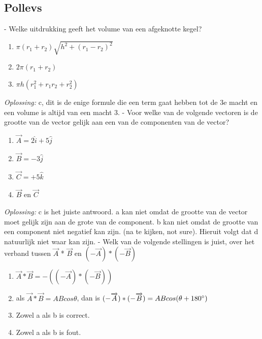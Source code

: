 \documentclass[12pt,a4paper]{article}
\begin{document}
    \subsection{Pollevs}
    - Welke uitdrukking geeft het volume van een afgeknotte kegel?
    \begin{enumerate}
        [label=\alph*)]
        \item \(\pi(r_1 + r_2)\sqrt{h^2 + (r_1 - r_2)^2}\)
        \item \(2\pi(r_1 + r_2)\)
        \item \(\pi h(r_1^2 + r_1r_2 + r_2^2)\)
    \end{enumerate}
    \textit{Oplossing:} c, dit is de enige formule die een term gaat hebben tot de 3e macht en een volume is altijd van een macht 3.
    \newline
    - Voor welke van de volgende vectoren is de grootte van de vector gelijk aan een van de componenten van de vector?
    \begin{enumerate}
        [label = \alph*)]
        \item \(\overrightarrow{A} = 2\hat{i} + 5\hat{j}\)
        \item \(\overrightarrow{B} = -3\hat{j}\)
        \item \(\overrightarrow{C} = +5\hat{k}\)
        \item \(\overrightarrow{B} \text{ en } \overrightarrow{C}\)
    \end{enumerate}
    \textit{Oplossing:} c is het juiste antwoord. a kan niet omdat de grootte van de vector moet gelijk zijn aan de grote van de component. b kan niet omdat de grootte van een component niet negatief kan zijn. (na te kijken, not sure). Hieruit volgt dat d natuurlijk niet waar kan zijn.
    \newline
    - Welk van de volgende stellingen is juist, over het verband tussen $\overrightarrow{A}$ * $\overrightarrow{B}$ en \((-\overrightarrow{A}) * (-\overrightarrow{B})\)
    \begin{enumerate}
        [label=\alph*)]
        \item \(\overrightarrow{A} * \overrightarrow{B} = -((-\overrightarrow{A})*(-\overrightarrow{B}))\)
        \item als \(\overrightarrow{A} * \overrightarrow{B} = ABcos\theta \), dan is \((-\overrightarrow{A}) * (-\overrightarrow{B}) = ABcos(\theta + 180\degree)\)
        \item Zowel a als b is correct.
        \item Zowel a als b is fout.
    \end{enumerate}
\end{document}
